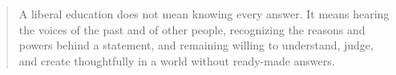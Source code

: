 \begin{quote}
A liberal education does not mean knowing every answer. It means hearing the voices of the past and of other people, recognizing the reasons and powers behind a statement, and remaining willing to understand, judge, and create thoughtfully in a world without ready-made answers.
\end{quote}


